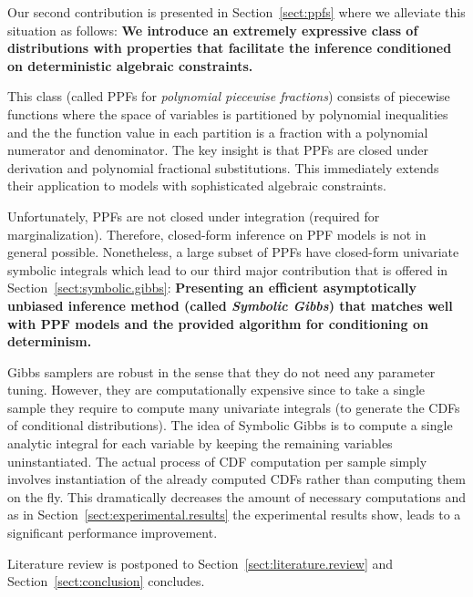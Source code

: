 \documentclass{article}
\begin{document}
Our second contribution is presented in Section~\ref{sect:ppfs} where we {\color{green}alleviate} this situation as follows:
{\bf
We introduce an extremely expressive class of distributions with properties that facilitate the inference conditioned on deterministic algebraic constraints.
}

This class (called PPFs for \emph{polynomial piecewise fractions}) {\color{green}consists of} piecewise functions where the space of variables is partitioned by polynomial inequalities and the the function value in each partition is a fraction with a polynomial numerator and denominator.  
The key insight is that PPFs are closed under derivation and polynomial fractional substitutions. This immediately extends their application to models with sophisticated algebraic constraints.

Unfortunately, PPFs are not closed under integration 
(required for marginalization).
Therefore, closed-form inference on PPF models is not in general possible. 
Nonetheless, a large subset of PPFs have closed-form univariate symbolic integrals which lead to our third major contribution that is offered in Section~\ref{sect:symbolic.gibbs}:
{
\bf
Presenting an efficient asymptotically unbiased inference method (called \emph{Symbolic Gibbs}) that matches well with PPF models and the provided algorithm for conditioning on determinism.
}

Gibbs samplers are robust in the sense that they do not need any parameter tuning.
However, they are computationally expensive since to take a single sample they require to compute many univariate integrals (to generate the CDFs of conditional distributions).
The idea of Symbolic Gibbs is to compute a single analytic integral for each variable by keeping the remaining variables uninstantiated. 
The actual process of CDF computation per sample  
simply involves instantiation of the already computed CDFs rather than computing them on the fly.
This dramatically decreases the amount of necessary computations and as in Section~\ref{sect:experimental.results} the experimental results show, leads to a significant performance improvement. 

Literature review is postponed to Section~\ref{sect:literature.review} and Section~\ref{sect:conclusion} concludes. 
\end{document}
